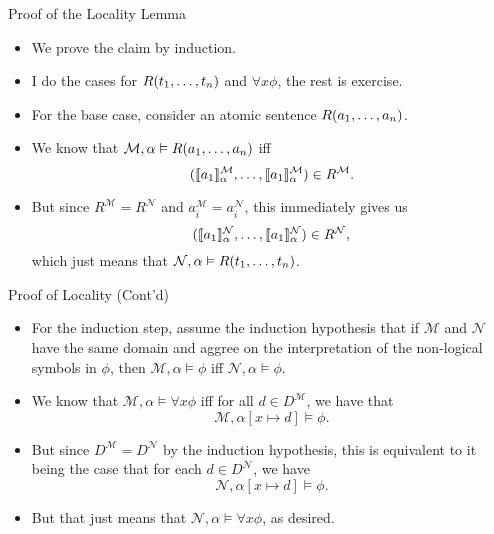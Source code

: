 \begin{frame}{Proof of the Locality Lemma}

  \begin{itemize}
  \item We prove the claim by induction.
    \item I do the cases for $R(t_1, \mathellipsis, t_n)$ and $\forall
      x\phi$, the rest is exercise.
      \item For the base case, consider an atomic sentence $R(a_1,
        \mathellipsis, a_n)$.
        \item We know that $\mathcal{M},\alpha\vDash
          R(a_1,\mathellipsis, a_n)$ iff \[(\llbracket
                  a_1\rrbracket_\alpha^\mathcal{M}, \mathellipsis,
                  \llbracket a_1\rrbracket_\alpha^\mathcal{M}) \in
                  R^\mathcal{M}.\]
                  \item But since $R^\mathcal{M}=R^\mathcal{N}$ and
                    $a_i^\mathcal{M}=a_i^\mathcal{N}$, this immediately
                    gives us \[(\llbracket
                  a_1\rrbracket_\alpha^\mathcal{N}, \mathellipsis,
                  \llbracket a_1\rrbracket_\alpha^\mathcal{N}) \in
                  R^\mathcal{N},\] which just means that
                $\mathcal{N},\alpha\vDash R(t_1, \mathellipsis, t_n)$.
  \end{itemize}
  
\end{frame}

\begin{frame}{Proof of Locality (Cont'd)}

  \begin{itemize}
  \item For the induction step, assume the induction hypothesis that
    if $\mathcal{M}$ and 
    $\mathcal{N}$ have the same domain and aggree on the
    interpretation of the non-logical 
    symbols in $\phi$, then $\mathcal{M},\alpha\vDash \phi$ iff
    $\mathcal{N},\alpha\vDash\phi$.

  \item We know that $\mathcal{M},\alpha\vDash\forall x\phi$ iff for
    all $d\in D^\mathcal{M}$, we have that
    \[\mathcal{M},\alpha[x\mapsto d]\vDash\phi.\]

    \item But since $D^\mathcal{M}=D^\mathcal{N}$ by the induction
      hypothesis, this is equivalent to it being the case that  for each $d\in D^\mathcal{N}$, we
      have  \[\mathcal{N},\alpha[x\mapsto d]\vDash\phi.\]

      \item But that just means that $\mathcal{N},\alpha\vDash \forall
        x\phi$, as desired.
    
  \end{itemize}
  
\end{frame}

